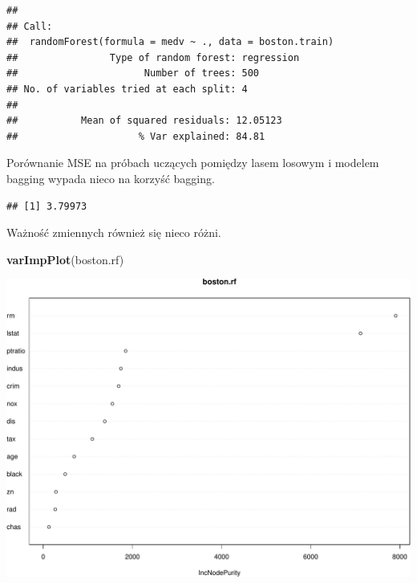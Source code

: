 \documentclass[
]{book}
\newenvironment{Shaded}{\begin{snugshade}}{\end{snugshade}}
\newcommand{\DataTypeTok}[1]{\textcolor[rgb]{0.13,0.29,0.53}{#1}}
\newcommand{\KeywordTok}[1]{\textcolor[rgb]{0.13,0.29,0.53}{\textbf{#1}}}
\newcommand{\NormalTok}[1]{#1}
\newcommand{\OperatorTok}[1]{\textcolor[rgb]{0.81,0.36,0.00}{\textbf{#1}}}
\newcommand{\StringTok}[1]{\textcolor[rgb]{0.31,0.60,0.02}{#1}}
\theoremstyle{plain}
\theoremstyle{definition}
\theoremstyle{definition}
\theoremstyle{definition}
\theoremstyle{definition}
\theoremstyle{remark}
\begin{document}
\begin{verbatim}
## 
## Call:
##  randomForest(formula = medv ~ ., data = boston.train) 
##                Type of random forest: regression
##                      Number of trees: 500
## No. of variables tried at each split: 4
## 
##           Mean of squared residuals: 12.05123
##                     % Var explained: 84.81
\end{verbatim}

Porównanie MSE na próbach uczących pomiędzy lasem losowym i modelem bagging wypada nieco na korzyść bagging.

\begin{Shaded}
\end{Shaded}

\begin{verbatim}
## [1] 3.79973
\end{verbatim}

Ważność zmiennych również się nieco różni.

\begin{Shaded}
\begin{Highlighting}[]
\KeywordTok{varImpPlot}\NormalTok{(boston.rf)}
\end{Highlighting}
\end{Shaded}

\includegraphics{EksploracjaDanych_files/figure-latex/unnamed-chunk-41-1.pdf}
\end{document}
